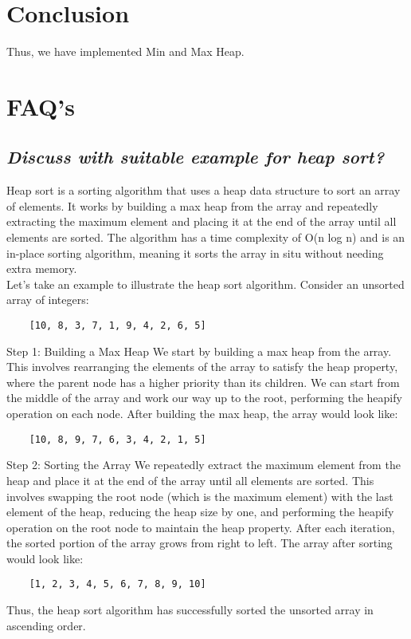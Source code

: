 \documentclass{article}
\begin{document}
\section{\textbf{Conclusion}}
Thus, we have implemented Min and Max Heap.
\section{\textbf{FAQ's}}
\subsection{\textit{Discuss with suitable example for heap sort?}}
Heap sort is a sorting algorithm that uses a heap data structure to sort an array of elements. It works by building a max heap from the array and repeatedly extracting the maximum element and placing it at the end of the array until all elements are sorted. The algorithm has a time complexity of O(n log n) and is an in-place sorting algorithm, meaning it sorts the array in situ without needing extra memory.\\

Let's take an example to illustrate the heap sort algorithm. Consider an unsorted array of integers:
\begin{lstlisting}
	[10, 8, 3, 7, 1, 9, 4, 2, 6, 5]
\end{lstlisting}
Step 1: Building a Max Heap
We start by building a max heap from the array. This involves rearranging the elements of the array to satisfy the heap property, where the parent node has a higher priority than its children. We can start from the middle of the array and work our way up to the root, performing the heapify operation on each node. After building the max heap, the array would look like:
\begin{lstlisting}
	[10, 8, 9, 7, 6, 3, 4, 2, 1, 5]
\end{lstlisting}
Step 2: Sorting the Array
We repeatedly extract the maximum element from the heap and place it at the end of the array until all elements are sorted. This involves swapping the root node (which is the maximum element) with the last element of the heap, reducing the heap size by one, and performing the heapify operation on the root node to maintain the heap property. After each iteration, the sorted portion of the array grows from right to left. The array after sorting would look like:
\begin{lstlisting}
	[1, 2, 3, 4, 5, 6, 7, 8, 9, 10]
\end{lstlisting}
Thus, the heap sort algorithm has successfully sorted the unsorted array in ascending order.
\end{document}
